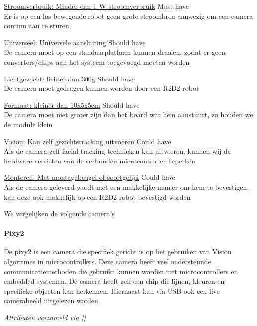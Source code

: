 \documentclass[11pt]{article}
\begin{document}
    \noindent \underline{Stroomverbruik: Minder dan 1 W stroomverbruik} \hfill Must have\\
    Er is op een los bewegende robot geen grote stroombron aanwezig om een camera continu aan te sturen.

    \noindent \underline{Universeel: Universele aansluiting} \hfill Should have\\
    De camera moet op een standaarplatform kunnen draaien, zodat er geen converters/chips aan het systeem toegevoegd moeten worden

    \noindent \underline{Lichtgewicht: lichter dan 300g} \hfill Should have\\
    De camera moet gedragen kunnen worden door een R2D2 robot

    \noindent \underline{Formaat: kleiner dan 10x5x5cm} \hfill Should have\\
    De camera moet niet groter zijn dan het board wat hem aanstuurt, zo houden we de module klein

    \noindent \underline{Vision: Kan zelf gezichtstracking uitvoeren} \hfill Could have\\
    Als de camera zelf facial tracking technieken kan uitvoeren, kunnen wij de hardware-vereisten van de verbonden microcontroller beperken

    \noindent \underline{Monteren: Met montagebeugel of soortgelijk} \hfill Could have\\
    Als de camera geleverd wordt met een makkelijke manier om hem te bevestigen, kan deze ook makkelijk op een R2D2 robot bevestigd worden


    \vspace{1em}

    We vergelijken de volgende camera's

    \paragraph{Pixy2}
    \href{https://pixycam.com/pixy2/}
    De pixy2 is een camera die specifiek gericht is op het gebruiken van Vision algoritmes in microcontrollers.
    Deze camera heeft veel ondersteunde communicatiemethoden die gebruikt kunnen worden met microcontrollers en embedded systemen.
    De camera heeft zelf een chip die lijnen, kleuren en specifieke objecten kan herkennen.
    Hiernaast kan via USB ook een live camerabeeld uitgelezen worden.


    \emph{Attributen verzameld via []}
\end{document}
